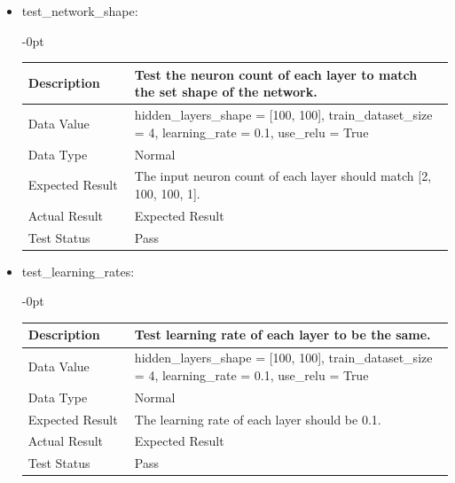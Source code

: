 \documentclass[./project-report/src/latex/project-report.tex]{subfiles}
\begin{document}
\begin{itemize}
\begin{itemize}
\begin{itemize}
					\item test\_network\_shape: \newline
					\begin{adjustwidth}{-\leftmargin}{0pt}
					\begin{tabular}{|p{0.25\linewidth}|p{0.75\linewidth}|}
						\hline
						Description & Test the neuron count of each layer to match the set shape of the network. \\
						\hline
						Data Value & hidden\_layers\_shape = [100, 100], \newline
                         	train\_dataset\_size = 4, \newline
                         	learning\_rate = 0.1, \newline
                         	use\_relu = True \\
						\hline
						Data Type & Normal \\
						\hline
						Expected Result & The input neuron count of each layer should match [2, 100, 100, 1]. \\
						\hline
						Actual Result & Expected Result \\
						\hline
						Test Status & Pass \\
						\hline
					\end{tabular}
					\end{adjustwidth}
					
					\vspace{5mm}

					\item test\_learning\_rates: \newline
					\begin{adjustwidth}{-\leftmargin}{0pt}
					\begin{tabular}{|p{0.25\linewidth}|p{0.75\linewidth}|}
						\hline
						Description & Test learning rate of each layer to be the same. \\
						\hline
						Data Value & hidden\_layers\_shape = [100, 100], \newline
                         	train\_dataset\_size = 4, \newline
                         	learning\_rate = 0.1, \newline
                         	use\_relu = True \\
						\hline
						Data Type & Normal \\
						\hline
						Expected Result & The learning rate of each layer should be 0.1. \\
						\hline
						Actual Result & Expected Result \\
						\hline
						Test Status & Pass \\
						\hline
					\end{tabular}
					\end{adjustwidth}
					

\end{itemize}
\end{itemize}
\end{itemize}
\end{document}
